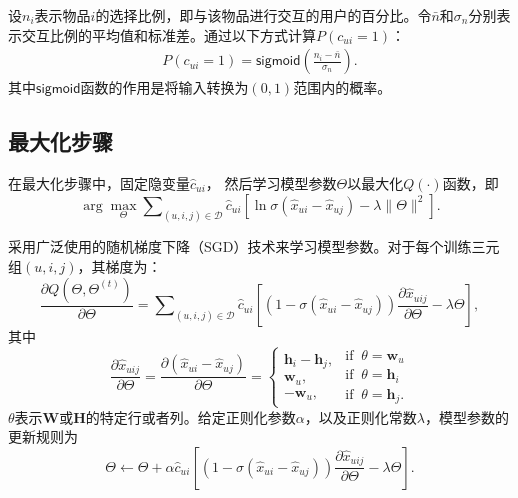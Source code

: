 设$n_i$表示物品$i$的选择比例，即与该物品进行交互的用户的百分比。令$\bar{n}$和$\sigma_n$分别表示交互比例的平均值和标准差。通过以下方式计算$P(c_{ui} =1)$：
\begin{eqnarray}
	P(c_{ui} =1) = \mathsf{sigmoid}(\frac{n_i - \bar{n} }{\sigma_n}).
\end{eqnarray}
其中$\mathsf{sigmoid}$函数的作用是将输入转换为$(0,1)$范围内的概率。
\subsection{最大化步骤}
在最大化步骤中，固定隐变量$\hat{c}_{ui}$， 然后学习模型参数$\Theta$以最大化$Q(\cdot)$函数，即
\begin{equation}\label{Eq:MaxQFunction}
	\arg \mathop {\max }\limits_\Theta  \sum\nolimits_{(u,i,j) \in \mathcal{D}} {{{\hat c}_{ui}}[\ln \sigma ({{\hat x}_{ui}} - {{\hat x}_{uj}}) - {\lambda  }\|\Theta\|^2]}.
\end{equation}

\par
采用广泛使用的随机梯度下降（SGD）技术来学习模型参数。对于每个训练三元组$(u,i,j)$，其梯度为：
\begin{equation}\label{Eq:Gradient1}
	\frac{{\partial Q(\Theta, \Theta^{(t)} )}}{{\partial \Theta }} = \sum\nolimits_{(u,i,j) \in \mathcal{D}} \hat{c}_{ui} [ (1 - \sigma(\hat{x}_{ui}-\hat{x}_{uj}))\frac{\partial\hat{x}_{uij}}{\partial\Theta} - \lambda\Theta ],
\end{equation}
其中
\begin{equation}\label{Eq:Gradient2}
	\frac{{\partial {{\hat x}_{uij}}}}{{\partial \Theta }} = \frac{{\partial ({{\hat x}_{ui}} - {{\hat x}_{uj}})}}{{\partial \Theta }} = \left\{ {\begin{array}{*{20}{l}}
			{\mathbf{h}}_i - \mathbf{h}_j,\\
			{\mathbf{w}}_{u},\\
			{ - \mathbf{w}}_{u},
		\end{array}\begin{array}{*{20}{l}}
			{\mathrm{if} \;\; \theta  = {\mathbf{w}}_u}\\
			{\mathrm{if} \;\; \theta  = {\mathbf{h}}_i}\\
			{\mathrm{if} \;\; \theta  = {\mathbf{h}}_j}.
	\end{array}} \right.
\end{equation}
$\theta$表示$\mathbf{W}$或$\mathbf{H}$的特定行或者列。给定正则化参数$\alpha$，以及正则化常数$\lambda$，模型参数的更新规则为
\begin{equation}\label{Eq:Updating}
	\Theta  \leftarrow \Theta  + \alpha \hat{c}_{ui} [ (1 - \sigma(\hat{x}_{ui}-\hat{x}_{uj}))\frac{\partial\hat{x}_{uij}}{\partial\Theta} - \lambda\Theta ].
\end{equation}
